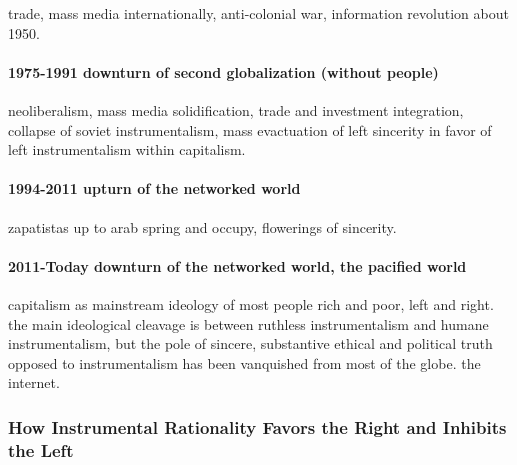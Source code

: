\documentclass[12pt,book]{article}
\begin{document}
trade, mass media internationally, anti-colonial war, information
revolution about 1950.

\paragraph{1975-1991 downturn of second globalization (without
people)}\label{downturn-of-second-globalization-without-people}

neoliberalism, mass media solidification, trade and investment
integration, collapse of soviet instrumentalism, mass evactuation of
left sincerity in favor of left instrumentalism within capitalism.

\paragraph{1994-2011 upturn of the networked
world}\label{upturn-of-the-networked-world}

zapatistas up to arab spring and occupy, flowerings of sincerity.

\paragraph{2011-Today downturn of the networked world, the pacified
world}\label{today-downturn-of-the-networked-world-the-pacified-world}

capitalism as mainstream ideology of most people rich and poor, left and
right. the main ideological cleavage is between ruthless instrumentalism
and humane instrumentalism, but the pole of sincere, substantive ethical
and political truth opposed to instrumentalism has been vanquished from
most of the globe. the internet.

\subsubsection{How Instrumental Rationality Favors the Right and
Inhibits the
Left}\label{how-instrumental-rationality-favors-the-right-and-inhibits-the-left}
\end{document}
